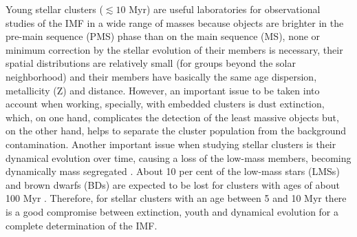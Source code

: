 \documentclass[12pt]{article}
\begin{document}
 Young stellar clusters ($\lesssim 10$ Myr) are useful laboratories for observational studies of the IMF in a wide range of masses because objects are brighter in the pre-main sequence (\ac{PMS}) phase than on the main sequence (\ac{MS}), none or minimum correction by the stellar evolution of their members is necessary, their spatial distributions are relatively small (for groups beyond the solar neighborhood) and their members have basically the same age dispersion, metallicity (\ac{Z}) and distance. However, an important issue to be taken into account when working, specially, with embedded clusters \citep[$\lesssim3$ Myr; ][]{Lada-Lada2003} is dust extinction, which, on one hand, complicates the detection of the least massive objects but, on the other hand, helps to separate the cluster population from the background contamination. Another important issue when studying stellar clusters is their dynamical evolution over time, causing a loss of the low-mass members, becoming dynamically mass segregated \citep[e.g., ][]{Elmegreen2000}. About 10 per cent of the low-mass stars (\ac{LMS}s) and brown dwarfs (\ac{BD}s) are expected to be lost for clusters with ages of about 100 Myr \citep{deLaFuenteMarcos-deLaFuenteMarcos2000}. Therefore, for stellar clusters with an age between 5 and 10 Myr there is a good compromise between extinction, youth and dynamical evolution for a complete determination of the IMF.
\end{document}
